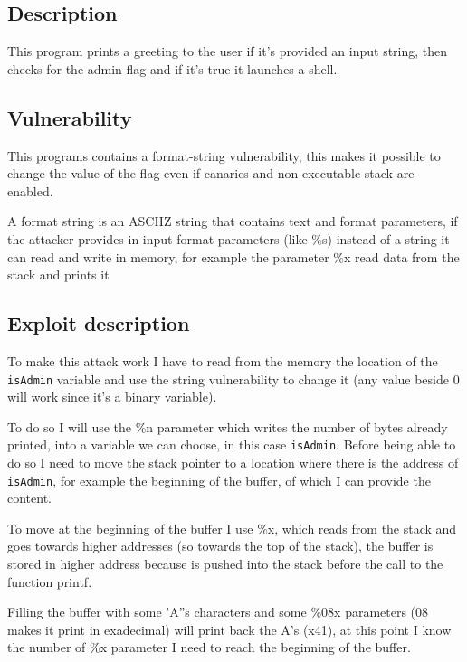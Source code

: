 \documentclass[a4paper,12pt]{article}
\begin{document}
\subsection{Description}
This program prints a greeting to the user if it's provided an input string, then checks for the admin flag and if it's true it launches a shell. 



\subsection{Vulnerability}

This programs contains a format-string vulnerability, this makes it possible to change the value of the flag even if canaries and non-executable stack are enabled.

A format string is an ASCIIZ string that contains text and format parameters, if the attacker provides in input format parameters (like \%s) instead of a string it can read and write in memory, for example the parameter \%x read data from the stack and prints it %

\subsection{Exploit description}

To make this attack work I have to read from the memory the location of the \texttt{isAdmin} variable and use the string vulnerability to change it (any value beside 0 will work since it's a binary variable). 

To do so I will use the \%n parameter which writes the number of bytes already printed, into a variable we can choose, in this case \texttt{isAdmin}. Before being able to do so I need to move the stack pointer to a location where there is the address of \texttt{isAdmin}, for example the beginning of the buffer, of which I can provide the content.

To move at the beginning of the buffer I use \%x, which reads from the stack and goes towards higher addresses (so towards the top of the stack), the buffer is stored in higher address because is pushed into the stack before the call to the function printf.

Filling the buffer with some 'A''s characters and some \%08x parameters (08 makes it print in exadecimal) will print back the A's (x41), at this point I know the number of \%x parameter I need to reach the beginning of the buffer.
\end{document}
